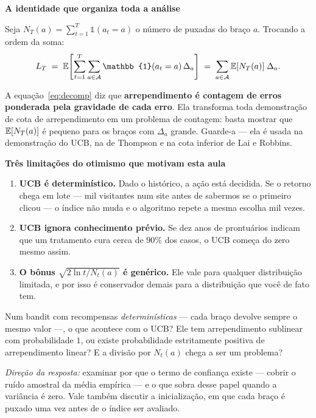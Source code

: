 \documentclass[11pt, a4paper]{article}
\newcommand{\Ind}{\mathbb{1}}
\newcommand{\subt}[1]{\medskip\noindent\textbf{\color{rlAzulClaro}#1}\par\nobreak\smallskip}
\begin{document}
\subt{A identidade que organiza toda a análise}

Seja $N_T(a) = \sum_{t=1}^{T}\Ind(a_t = a)$ o número de puxadas do braço $a$.
Trocando a ordem da soma:
\begin{equation}
  L_T \;=\; \E\!\left[\sum_{t=1}^{T}\sum_{a \in \gA} \Ind(a_t = a)\,\Delta_a\right]
      \;=\; \sum_{a \in \gA} \E[N_T(a)]\;\Delta_a .
  \label{eq:decomp}
\end{equation}

\begin{ideiabox}
A equação~\eqref{eq:decomp} diz que \textbf{arrependimento é contagem de erros
ponderada pela gravidade de cada erro}. Ela transforma toda demonstração de cota
de arrependimento em um problema de contagem: basta mostrar que
$\mathbb{E}[N_T(a)]$ é pequeno para os braços com $\Delta_a$ grande. Guarde-a — ela é
usada na demonstração do UCB, na de Thompson e na cota inferior de Lai e
Robbins.
\end{ideiabox}

\subt{Três limitações do otimismo que motivam esta aula}

\begin{enumerate}
  \item \textbf{UCB é determinístico.} Dado o histórico, a ação está decidida.
        Se o retorno chega em lote — mil visitantes num site antes de sabermos
        se o primeiro clicou — o índice não muda e o algoritmo repete a mesma
        escolha mil vezes.
  \item \textbf{UCB ignora conhecimento prévio.} Se dez anos de prontuários
        indicam que um tratamento cura cerca de $90\%$ dos casos, o UCB começa
        do zero mesmo assim.
  \item \textbf{O bônus $\sqrt{2\ln t / N_t(a)}$ é genérico.} Ele vale para
        qualquer distribuição limitada, e por isso é conservador demais para a
        distribuição que você de fato tem.
\end{enumerate}

\begin{discbox}
Num bandit com recompensas \emph{determinísticas} — cada braço devolve sempre o
mesmo valor —, o que acontece com o UCB? Ele tem arrependimento sublinear com
probabilidade $1$, ou existe probabilidade estritamente positiva de
arrependimento linear? E a divisão por $N_t(a)$ chega a ser um problema?

\smallskip
{\footnotesize\color{rlCinza}\emph{Direção da resposta:} examinar por que o termo
de confiança existe — cobrir o ruído amostral da média empírica — e o que
sobra desse papel quando a variância é zero. Vale também discutir a
inicialização, em que cada braço é puxado uma vez antes de o índice ser
avaliado.}
\end{discbox}
\end{document}
